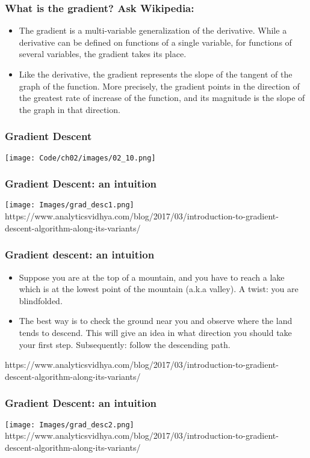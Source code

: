 \documentclass{beamer}
\begin{document}
\begin{frame}
\frametitle{What is the gradient? Ask Wikipedia:}
\begin{itemize}
\item The gradient is a multi-variable generalization of the derivative. While a derivative can be defined on functions of a single variable, for functions of several variables, the gradient takes its place.
\item Like the derivative, the gradient represents the slope of the tangent of the graph of the function. More precisely, the gradient points in the direction of the greatest rate of increase of the function, and its magnitude is the slope of the graph in that direction.
\end{itemize}
\end{frame}

\begin{frame}
  \frametitle{Gradient Descent}
  \texttt{[image: Code/ch02/images/02\_10.png]}
\end{frame}

\begin{frame}
  \frametitle{Gradient Descent: an intuition}
  \center
  \texttt{[image: Images/grad\_desc1.png]}
  \tiny
  \vspace{0.2in}
  https://www.analyticsvidhya.com/blog/2017/03/introduction-to-gradient-descent-algorithm-along-its-variants/
\end{frame}

\begin{frame}
  \frametitle{Gradient descent: an intuition}
  \begin{itemize}
  \item Suppose you are at the top of a mountain, and you have to reach a lake which is at the lowest point of the mountain (a.k.a valley). A twist: you are blindfolded.
  \item The best way is to check the ground near you and observe where the land tends to descend. This will give an idea in what direction you should take your first step. Subsequently: follow the descending path.
  \end{itemize}
  \vspace{0.2in}
  \tiny
  https://www.analyticsvidhya.com/blog/2017/03/introduction-to-gradient-descent-algorithm-along-its-variants/
\end{frame}

\begin{frame}
  \frametitle{Gradient Descent: an intuition}
  \center
  \texttt{[image: Images/grad\_desc2.png]}
  \vspace{0.2in}
  \tiny
  https://www.analyticsvidhya.com/blog/2017/03/introduction-to-gradient-descent-algorithm-along-its-variants/
\end{frame}
\end{document}
